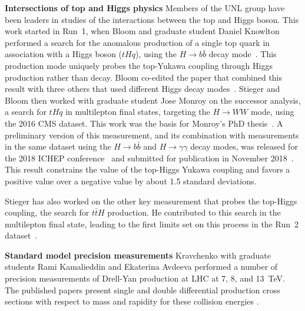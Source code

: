 {\bf Intersections of top and Higgs physics} Members of the UNL group have been leaders in studies of the interactions between the top and Higgs boson.  This work started in Run~1, when Bloom and graduate student Daniel Knowlton performed a search for the anomalous production of a single top quark in association with a Higgs boson ($tHq$), using the $H \to b\bar{b}$ decay mode~\cite{bib:tHqbbPAS}.  This production mode uniquely probes the top-Yukawa coupling through Higgs production rather than decay.  Bloom co-edited the paper that combined this result with three others that used different Higgs decay modes~\cite{bib:tHqRun1}.  Stieger and Bloom then worked with graduate student Jose Monroy on the successor analysis, a search for $tHq$ in multilepton final states, targeting the $H \to WW$ mode, using the 2016 CMS dataset.  This work was the basis for Monroy's PhD thesis~\cite{bib:monroy_thesis}.  A preliminary version of this measurement, and its combination with measurements in the same dataset using the $H\to b\bar{b}$ and $H \to \gamma\gamma$ decay modes, was released for the 2018 ICHEP conference~\cite{bib:tHqRun2PAS} and submitted for publication in November 2018~\cite{bib:tHqRun2}.  This result constrains the value of the top-Higgs Yukawa coupling and favors a positive value over a negative value by about 1.5 standard deviations.

Stieger has also worked on the other key measurement that probes the top-Higgs
coupling, the search for $t\bar{t}H$ production.  He contributed to
this search in the multilepton final state, leading to the first limits set
on this process in the Run~2 dataset~\cite{bib:ttHmultilep}.

{\bf Standard model precision measurements} Kravchenko with graduate students Rami Kamalieddin and Ekaterina Avdeeva performed a number of precision measurements of Drell-Yan production at LHC at 7, 8, and 13~TeV. The published papers present single and double differential production cross sections with respect to mass and rapidity for these collision energies \cite{bib:DY7,bib:DY8,bib:DY13}.

